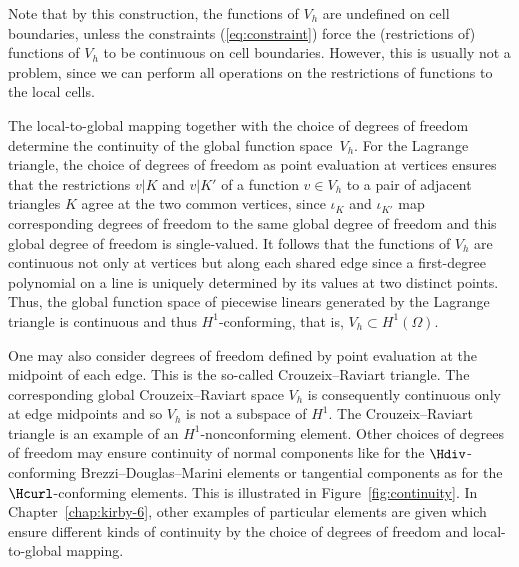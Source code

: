 Note that by this construction, the functions of $V_h$ are undefined
on cell boundaries, unless the constraints (\ref{eq:constraint}) force
the (restrictions of) functions of $V_h$ to be continuous on cell
boundaries. However, this is usually not a problem, since we can
perform all operations on the restrictions of functions to the local
cells.

The local-to-global mapping together with the choice of degrees of
freedom determine the continuity of the global function space~$V_h$.
For the Lagrange triangle, the choice of degrees of freedom as point
evaluation at vertices ensures that the restrictions $v|K$ and
$v|{K'}$ of a function $v \in V_h$ to a pair of adjacent triangles $K$
agree at the two common vertices, since $\iota_K$ and $\iota_{K'}$ map
corresponding degrees of freedom to the same global degree of freedom
and this global degree of freedom is single-valued. It follows that
the functions of $V_h$ are continuous not only at vertices but along
each shared edge since a first-degree polynomial on a line is uniquely
determined by its values at two distinct points. Thus, the global
function space of piecewise linears generated by the Lagrange triangle
is continuous and thus $H^1$-conforming, that is, $V_h \subset
H^1(\Omega)$.

One may also consider degrees of freedom defined by point evaluation
at the midpoint of each edge. This is the so-called Crouzeix--Raviart
triangle. The corresponding global Crouzeix--Raviart space $V_h$ is
consequently continuous only at edge midpoints and so $V_h$ is not a
subspace of $H^1$. The Crouzeix--Raviart triangle is an example of an
$H^1$-nonconforming element. Other choices of degrees of freedom may
ensure continuity of normal components like for the $\Hdiv$-conforming
Brezzi--Douglas--Marini elements or tangential components as for the
$\Hcurl$-conforming \nedelec{} elements. This is illustrated in
Figure~\ref{fig:continuity}. In Chapter~\ref{chap:kirby-6}, other
examples of particular elements are given which ensure different kinds
of continuity by the choice of degrees of freedom and local-to-global
mapping.

